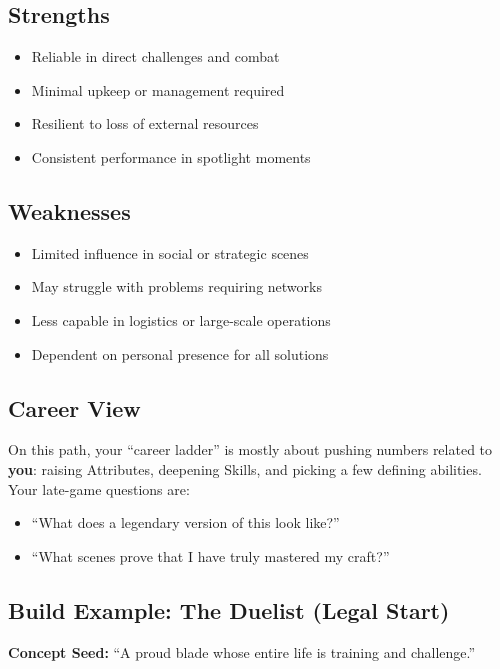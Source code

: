 \subsection*{Strengths}
\begin{itemize}
\item Reliable in direct challenges and combat
\item Minimal upkeep or management required
\item Resilient to loss of external resources
\item Consistent performance in spotlight moments
\end{itemize}

\subsection*{Weaknesses}
\begin{itemize}
\item Limited influence in social or strategic scenes
\item May struggle with problems requiring networks
\item Less capable in logistics or large-scale operations
\item Dependent on personal presence for all solutions
\end{itemize}

\subsection*{Career View}

On this path, your ``career ladder'' is mostly about pushing numbers related to
\textbf{you}: raising Attributes, deepening Skills, and picking a few defining
abilities. Your late-game questions are:
\begin{itemize}
  \item ``What does a legendary version of this look like?''
  \item ``What scenes prove that I have truly mastered my craft?''
\end{itemize}

\subsection*{Build Example: The Duelist (Legal Start)}

\textbf{Concept Seed:} ``A proud blade whose entire life is training and challenge.''

\medskip

